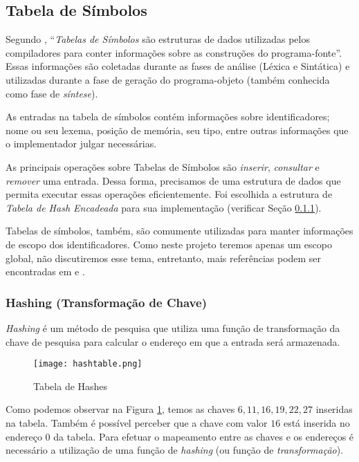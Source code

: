 \subsection{Tabela de Símbolos}
\label{sec:symtab}

Segundo , ``\emph{Tabelas de Símbolos} são
estruturas de dados utilizadas pelos compiladores para conter informações
sobre as construções do programa-fonte''. Essas informações são coletadas
durante as fases de análise (Léxica e Sintática) e utilizadas durante
a fase de geração do programa-objeto (também conhecida como fase de
\emph{síntese}).

As entradas na tabela de símbolos contém informações sobre
identificadores; nome ou seu lexema, posição de memória, seu tipo, entre
outras informações que o implementador julgar necessárias.

As principais operações sobre Tabelas de Símbolos são \emph{inserir},
\emph{consultar} e \emph{remover} uma entrada. Dessa forma, precisamos de uma
estrutura de dados que permita executar essas operações eficientemente.
Foi escolhida a estrutura de \emph{Tabela de Hash Encadeada} para sua
implementação (verificar Seção \ref{sec:hashing}).

Tabelas de símbolos, também, são comumente utilizadas para manter
informações de escopo dos identificadores. Como neste projeto teremos
apenas um escopo global, não discutiremos esse tema, entretanto, mais
referências podem ser encontradas em  e
.


\subsubsection{Hashing (Transformação de Chave)}
\label{sec:hashing}

\emph{Hashing} é um método de pesquisa que utiliza uma função de
transformação da chave de pesquisa para calcular o endereço em que a
entrada será armazenada.

\begin{figure}
	\begin{center}
		\texttt{[image: hashtable.png]}
	\end{center}
	\caption{Tabela de Hashes}
	\label{fig:hashtable}
\end{figure}

Como podemos observar na Figura \ref{fig:hashtable}, temos as chaves $6, 11,
16, 19, 22, 27$ inseridas na tabela. Também é possível perceber que a
chave com valor $16$ está inserida no endereço $0$ da tabela. Para efetuar
o mapeamento entre as chaves e os endereços é necessário a utilização de
uma função de \emph{hashing} (ou função de \emph{transformação}).

